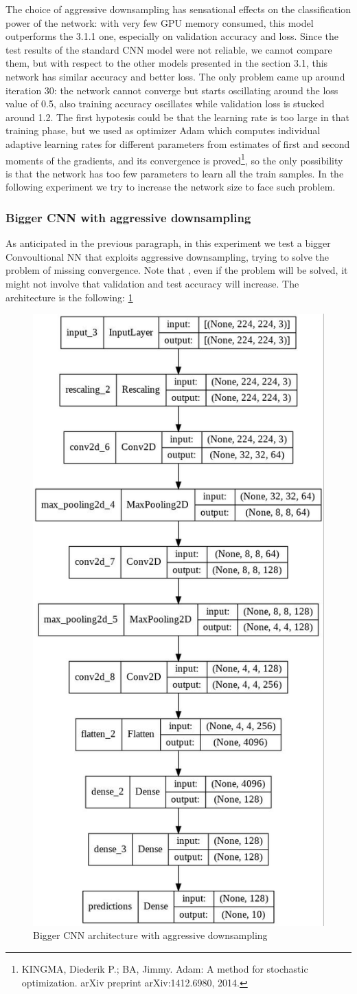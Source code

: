 \noindent The choice of aggressive downsampling has sensational effects on the classification power of the network: with very few GPU memory consumed, this model outperforms the 3.1.1 one, especially on validation accuracy and loss. Since the test results of the standard CNN model were not reliable, we cannot compare them, but with respect to the other models presented in the section 3.1, this network has similar accuracy and better loss. The only problem came up around iteration 30: the network cannot converge but starts oscillating around the loss value of 0.5, also training accuracy oscillates while validation loss is stucked around 1.2.
The first hypotesis could be that the learning rate is too large in that training phase, but we used as optimizer Adam which computes individual adaptive learning rates for different parameters from estimates of first and second moments of the gradients, and its convergence is proved\footnote{KINGMA, Diederik P.; BA, Jimmy. Adam: A method for stochastic optimization. arXiv preprint arXiv:1412.6980, 2014.}, so the only possibility is that the network has too few parameters to learn all the train samples. In the following experiment we try to increase the network size to face such problem.


\subsubsection{Bigger CNN with aggressive downsampling}
As anticipated in the previous paragraph, in this experiment we test a bigger Convoultional NN that exploits aggressive downsampling, trying to solve the problem of missing convergence. Note that , even if the problem will be solved, it might not involve that validation and test accuracy will increase. The architecture is the following: \ref{fig: BiggerAggressiveDownsamplingCNN}

\begin{figure}[H]
	\centering
	\includegraphics[height=0.6\textwidth]{img/scratch/bigger_aggressive_downsampling.jpg}
	\caption{Bigger CNN architecture with aggressive downsampling}
	\label{fig: BiggerAggressiveDownsamplingCNN}
\end{figure}

